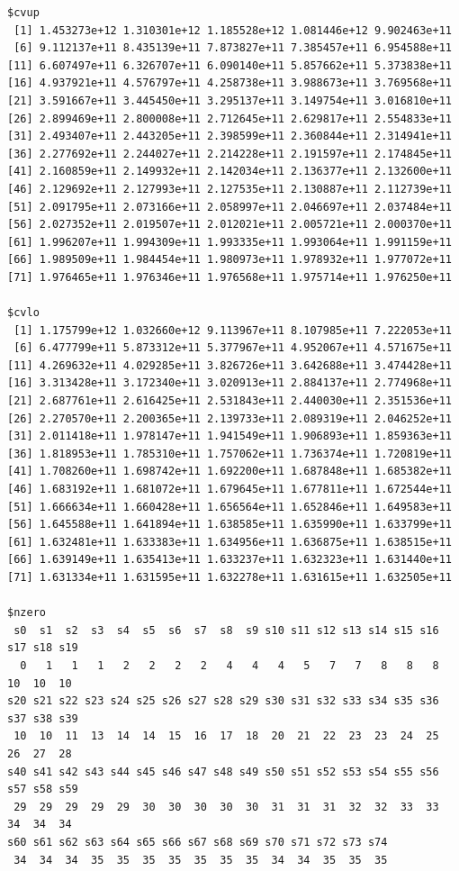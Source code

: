 \documentclass[
]{article}
\begin{document}
\begin{verbatim}
$cvup
 [1] 1.453273e+12 1.310301e+12 1.185528e+12 1.081446e+12 9.902463e+11
 [6] 9.112137e+11 8.435139e+11 7.873827e+11 7.385457e+11 6.954588e+11
[11] 6.607497e+11 6.326707e+11 6.090140e+11 5.857662e+11 5.373838e+11
[16] 4.937921e+11 4.576797e+11 4.258738e+11 3.988673e+11 3.769568e+11
[21] 3.591667e+11 3.445450e+11 3.295137e+11 3.149754e+11 3.016810e+11
[26] 2.899469e+11 2.800008e+11 2.712645e+11 2.629817e+11 2.554833e+11
[31] 2.493407e+11 2.443205e+11 2.398599e+11 2.360844e+11 2.314941e+11
[36] 2.277692e+11 2.244027e+11 2.214228e+11 2.191597e+11 2.174845e+11
[41] 2.160859e+11 2.149932e+11 2.142034e+11 2.136377e+11 2.132600e+11
[46] 2.129692e+11 2.127993e+11 2.127535e+11 2.130887e+11 2.112739e+11
[51] 2.091795e+11 2.073166e+11 2.058997e+11 2.046697e+11 2.037484e+11
[56] 2.027352e+11 2.019507e+11 2.012021e+11 2.005721e+11 2.000370e+11
[61] 1.996207e+11 1.994309e+11 1.993335e+11 1.993064e+11 1.991159e+11
[66] 1.989509e+11 1.984454e+11 1.980973e+11 1.978932e+11 1.977072e+11
[71] 1.976465e+11 1.976346e+11 1.976568e+11 1.975714e+11 1.976250e+11

$cvlo
 [1] 1.175799e+12 1.032660e+12 9.113967e+11 8.107985e+11 7.222053e+11
 [6] 6.477799e+11 5.873312e+11 5.377967e+11 4.952067e+11 4.571675e+11
[11] 4.269632e+11 4.029285e+11 3.826726e+11 3.642688e+11 3.474428e+11
[16] 3.313428e+11 3.172340e+11 3.020913e+11 2.884137e+11 2.774968e+11
[21] 2.687761e+11 2.616425e+11 2.531843e+11 2.440030e+11 2.351536e+11
[26] 2.270570e+11 2.200365e+11 2.139733e+11 2.089319e+11 2.046252e+11
[31] 2.011418e+11 1.978147e+11 1.941549e+11 1.906893e+11 1.859363e+11
[36] 1.818953e+11 1.785310e+11 1.757062e+11 1.736374e+11 1.720819e+11
[41] 1.708260e+11 1.698742e+11 1.692200e+11 1.687848e+11 1.685382e+11
[46] 1.683192e+11 1.681072e+11 1.679645e+11 1.677811e+11 1.672544e+11
[51] 1.666634e+11 1.660428e+11 1.656564e+11 1.652846e+11 1.649583e+11
[56] 1.645588e+11 1.641894e+11 1.638585e+11 1.635990e+11 1.633799e+11
[61] 1.632481e+11 1.633383e+11 1.634956e+11 1.636875e+11 1.638515e+11
[66] 1.639149e+11 1.635413e+11 1.633237e+11 1.632323e+11 1.631440e+11
[71] 1.631334e+11 1.631595e+11 1.632278e+11 1.631615e+11 1.632505e+11

$nzero
 s0  s1  s2  s3  s4  s5  s6  s7  s8  s9 s10 s11 s12 s13 s14 s15 s16 s17 s18 s19 
  0   1   1   1   2   2   2   2   4   4   4   5   7   7   8   8   8  10  10  10 
s20 s21 s22 s23 s24 s25 s26 s27 s28 s29 s30 s31 s32 s33 s34 s35 s36 s37 s38 s39 
 10  10  11  13  14  14  15  16  17  18  20  21  22  23  23  24  25  26  27  28 
s40 s41 s42 s43 s44 s45 s46 s47 s48 s49 s50 s51 s52 s53 s54 s55 s56 s57 s58 s59 
 29  29  29  29  29  30  30  30  30  30  31  31  31  32  32  33  33  34  34  34 
s60 s61 s62 s63 s64 s65 s66 s67 s68 s69 s70 s71 s72 s73 s74 
 34  34  34  35  35  35  35  35  35  35  34  34  35  35  35 


\end{verbatim}
\end{document}

